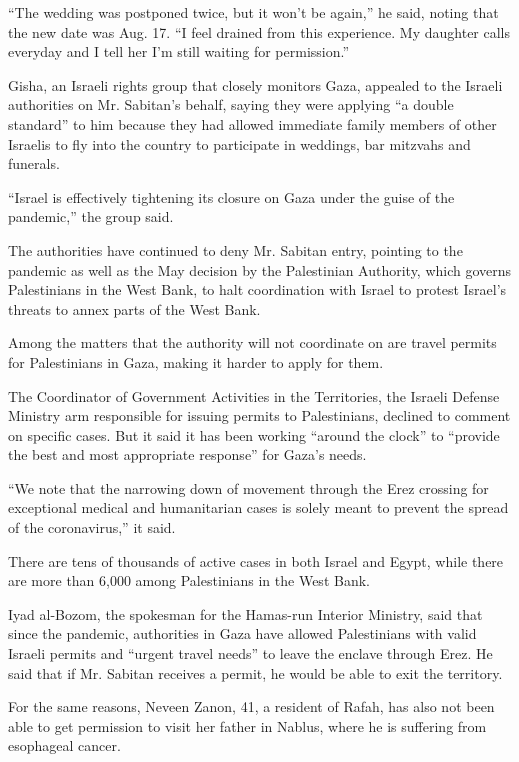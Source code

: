 ``The wedding was postponed twice, but it won't be again,'' he said,
noting that the new date was Aug. 17. ``I feel drained from this
experience. My daughter calls everyday and I tell her I'm still waiting
for permission.''

Gisha, an Israeli rights group that closely monitors Gaza, appealed to
the Israeli authorities on Mr. Sabitan's behalf, saying they were
applying ``a double standard'' to him because they had allowed immediate
family members of other Israelis to fly into the country to participate
in weddings, bar mitzvahs and funerals.

``Israel is effectively tightening its closure on Gaza under the guise
of the pandemic,'' the group said.

The authorities have continued to deny Mr. Sabitan entry, pointing to
the pandemic as well as the May decision by the Palestinian Authority,
which governs Palestinians in the West Bank, to halt coordination with
Israel to protest Israel's threats to annex parts of the West Bank.

Among the matters that the authority will not coordinate on are travel
permits for Palestinians in Gaza, making it harder to apply for them.

The Coordinator of Government Activities in the Territories, the Israeli
Defense Ministry arm responsible for issuing permits to Palestinians,
declined to comment on specific cases. But it said it has been working
``around the clock'' to ``provide the best and most appropriate
response'' for Gaza's needs.

``We note that the narrowing down of movement through the Erez crossing
for exceptional medical and humanitarian cases is solely meant to
prevent the spread of the coronavirus,'' it said.

There are tens of thousands of active cases in both Israel and Egypt,
while there are more than 6,000 among Palestinians in the West Bank.

Iyad al-Bozom, the spokesman for the Hamas-run Interior Ministry, said
that since the pandemic, authorities in Gaza have allowed Palestinians
with valid Israeli permits and ``urgent travel needs'' to leave the
enclave through Erez. He said that if Mr. Sabitan receives a permit, he
would be able to exit the territory.

For the same reasons, Neveen Zanon, 41, a resident of Rafah, has also
not been able to get permission to visit her father in Nablus, where he
is suffering from esophageal cancer.


